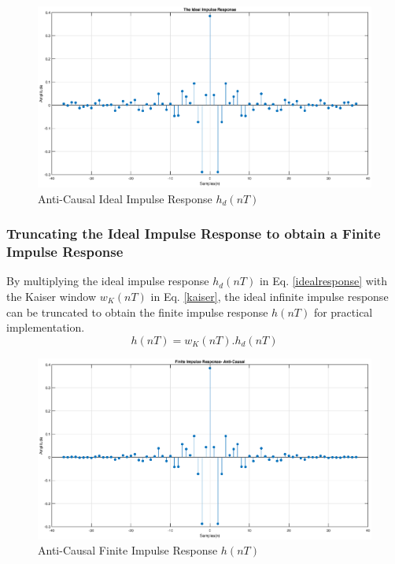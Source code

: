 \documentclass[a4paper,11pt]{article}%
\begin{document}
\begin{figure}[!h]
	\centering
	\includegraphics[scale=0.4]{figures/ideal-impulse}
	\caption{Anti-Causal Ideal Impulse Response $h_d(nT)$}
\end{figure}

\subsubsection{Truncating the Ideal Impulse Response to obtain a Finite Impulse Response}

By multiplying the ideal impulse response $h_d(nT)$ in Eq. \eqref{idealresponse} with the Kaiser window $w_K(nT)$ in Eq. \eqref{kaiser}, the ideal infinite impulse response can be truncated to obtain the finite impulse response $h(nT)$ for practical implementation.
\begin{equation}
h(nT) = 	w_K(nT).h_d(nT)
\end{equation}

\begin{figure}[!h]
	\centering
	\includegraphics[scale=0.4]{figures/fir-truncated}
	\caption{Anti-Causal Finite Impulse Response $h(nT)$}
	\label{firimp}
\end{figure}
\end{document}
